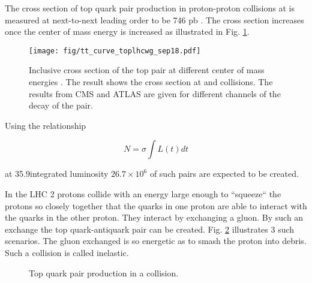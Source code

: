 The cross section of top quark pair production in proton-proton collisions at \TeV is measured at next-to-next leading order to be 746 pb \cite{Khachatryan:2015uqb}. The cross section increases once the center of mass energy is increased as illustrated in Fig. \ref{fig:tt_curve_toplhcwg_sep18}.

\begin{figure}[hbtp]

  \centering
  \texttt{[image: fig/tt\_curve\_toplhcwg\_sep18.pdf]}
  \caption{Inclusive cross section of the top pair at different center of mass energies \cite{twiki:tt_curve_toplhcwg_sep18}. The result shows the cross section at \Pp\Pp and \Pp\Pap collisions. The results from CMS and ATLAS are given for different channels of the decay of the \ttbar pair.}
  \label{fig:tt_curve_toplhcwg_sep18}
  
\end{figure}


Using the relationship

\begin{equation}
N=\sigma\int L(t)dt
\end{equation}

at 35.9\fbinv integrated luminosity $26.7\times10^{6}$ of such pairs are expected to be created. 

In the LHC 2 protons collide with an energy large enough to ``squeeze`` the protons so closely together that the quarks in one proton are able to interact with the quarks in the other proton. They interact by exchanging a gluon. By such an exchange the top quark-antiquark pair can be created. Fig. \ref{fig:top_quark_productions} illustrates 3 such scenarios. The gluon exchanged is so energetic as to smash the proton into debris. Such a collision is called inelastic.

\begin{figure}[h!]
  \centering
  \def\twidth{0.3}

  \caption{Top quark pair production in a \Pp\Pp collision.}
  \label{fig:top_quark_productions}
\end{figure}

